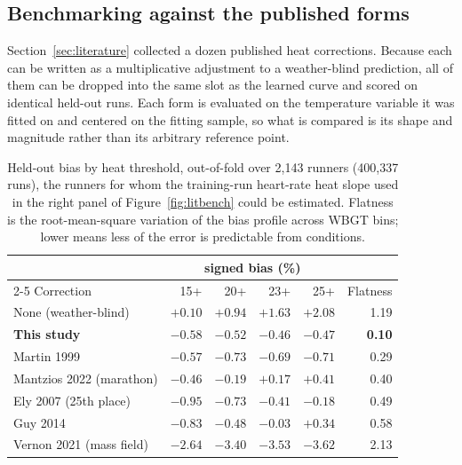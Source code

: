 \documentclass[11pt]{article}
\renewcommand{\_}{\textunderscore\allowbreak}
\begin{document}
\subsection{Benchmarking against the published forms}
\label{sec:benchmark}

Section~\ref{sec:literature} collected a dozen published heat corrections. Because each can be written
as a multiplicative adjustment to a weather-blind prediction, all of them can be dropped into the same
slot as the learned curve and scored on identical held-out runs. Each form is evaluated on the
temperature variable it was fitted on and centered on the fitting sample, so what is compared is its
shape and magnitude rather than its arbitrary reference point.

\begin{table}[!ht]
\centering\small
\caption{Held-out bias by heat threshold, out-of-fold over 2{,}143 runners (400{,}337 runs), the runners for whom the
training-run heart-rate heat slope used in the right panel of Figure~\ref{fig:litbench} could be estimated. Flatness is the root-mean-square variation of the bias profile across
WBGT bins; lower means less of the error is predictable from conditions.}
\label{tab:benchmark}
\begin{tabular}{@{}lrrrrr@{}}
\toprule
& \multicolumn{4}{c}{signed bias (\%)} & \\
\cmidrule(lr){2-5}
Correction & 15+ & 20+ & 23+ & 25+ & Flatness \\
\midrule
None (weather-blind)          & $+0.10$ & $+0.94$ & $+1.63$ & $+2.08$ & 1.19 \\
\textbf{This study}           & $-0.58$ & $-0.52$ & $-0.46$ & $-0.47$ & \textbf{0.10} \\
Martin 1999                   & $-0.57$ & $-0.73$ & $-0.69$ & $-0.71$ & 0.29 \\
Mantzios 2022 (marathon)      & $-0.46$ & $-0.19$ & $+0.17$ & $+0.41$ & 0.40 \\
Ely 2007 (25th place)         & $-0.95$ & $-0.73$ & $-0.41$ & $-0.18$ & 0.49 \\
Guy 2014                      & $-0.83$ & $-0.48$ & $\mathbf{-0.03}$ & $+0.34$ & 0.58 \\
Vernon 2021 (mass field)      & $-2.64$ & $-3.40$ & $-3.53$ & $-3.62$ & 2.13 \\
\bottomrule
\end{tabular}
\end{table}
\end{document}
